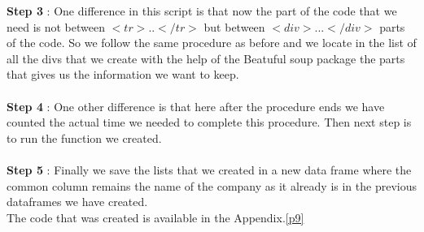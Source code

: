 \documentclass{book}
\begin{document}
\textbf{Step 3} : One difference in this script is that now the part of the code that we need is not between $<tr>..</tr>$ but between $<div>...</div>$ parts of the code. So we follow the same procedure as before and we locate in the list of all the divs that we create with the help of the Beatuful soup package the parts that gives us the information we want to keep.\\\\
\textbf{Step 4} : One other difference is that here after the procedure ends we have counted the actual time we needed to complete this procedure. Then next step is to run the function we created.\\\\
\textbf{Step 5} : Finally we save the lists that we created in a new data frame where the common column remains the name of the company as it already is in the previous dataframes we have created.\\
The code that was created is available in the Appendix.\ref{p9}
\end{document}
